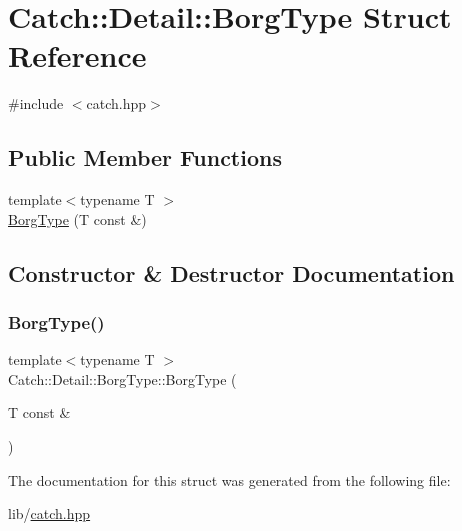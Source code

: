 \hypertarget{struct_catch_1_1_detail_1_1_borg_type}{}\section{Catch\+:\+:Detail\+:\+:Borg\+Type Struct Reference}
\label{struct_catch_1_1_detail_1_1_borg_type}


{\ttfamily \#include $<$catch.\+hpp$>$}

\subsection*{Public Member Functions}
\begin{DoxyCompactItemize}
\item 
{\footnotesize template$<$typename T $>$ }\\\hyperlink{struct_catch_1_1_detail_1_1_borg_type_a780a9946ed0d654f0bfc043c8fc505d8}{Borg\+Type} (T const \&)
\end{DoxyCompactItemize}


\subsection{Constructor \& Destructor Documentation}
\hypertarget{struct_catch_1_1_detail_1_1_borg_type_a780a9946ed0d654f0bfc043c8fc505d8}{}\label{struct_catch_1_1_detail_1_1_borg_type_a780a9946ed0d654f0bfc043c8fc505d8} 
\subsubsection{\texorpdfstring{Borg\+Type()}{BorgType()}}
{\footnotesize\ttfamily template$<$typename T $>$ \\
Catch\+::\+Detail\+::\+Borg\+Type\+::\+Borg\+Type (\begin{DoxyParamCaption}\item[{T const \&}]{ }\end{DoxyParamCaption})}



The documentation for this struct was generated from the following file\+:\begin{DoxyCompactItemize}
\item 
lib/\hyperlink{catch_8hpp}{catch.\+hpp}\end{DoxyCompactItemize}
